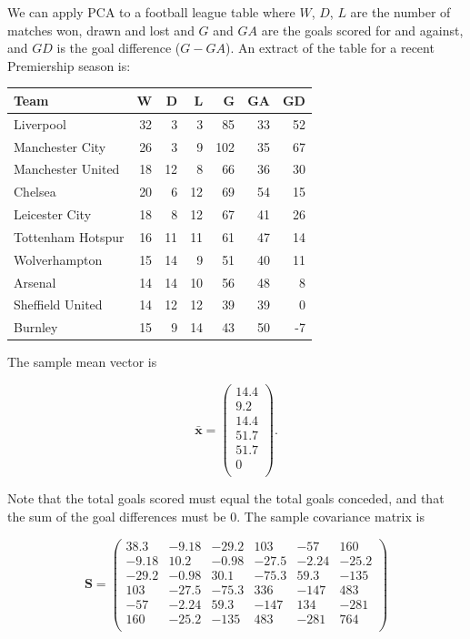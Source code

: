 \documentclass[]{book}
\theoremstyle{definition}
\theoremstyle{definition}
\theoremstyle{definition}
\theoremstyle{remark}
\begin{document}
We can apply PCA to a football league table where \(W\), \(D\), \(L\) are the number of matches won, drawn and lost and \(G\) and \(GA\) are the goals scored for and against, and \(GD\) is the goal difference (\(G-GA\)). An extract of the table for a recent Premiership season is:

\begin{tabular}{lrrrrrr}
\toprule
Team & W & D & L & G & GA & GD\\
\midrule
Liverpool & 32 & 3 & 3 & 85 & 33 & 52\\
Manchester City & 26 & 3 & 9 & 102 & 35 & 67\\
Manchester United & 18 & 12 & 8 & 66 & 36 & 30\\
Chelsea & 20 & 6 & 12 & 69 & 54 & 15\\
Leicester City & 18 & 8 & 12 & 67 & 41 & 26\\
\addlinespace
Tottenham Hotspur & 16 & 11 & 11 & 61 & 47 & 14\\
Wolverhampton & 15 & 14 & 9 & 51 & 40 & 11\\
Arsenal & 14 & 14 & 10 & 56 & 48 & 8\\
Sheffield United & 14 & 12 & 12 & 39 & 39 & 0\\
Burnley & 15 & 9 & 14 & 43 & 50 & -7\\
\bottomrule
\end{tabular}

The sample mean vector is

\[\bar{\boldsymbol x} =\begin{pmatrix}14.4 \\9.2 \\14.4 \\51.7 \\51.7 \\0 \\\end{pmatrix}.\]

Note that the total goals scored must equal the total goals conceded, and that the sum of the goal differences must be \(0\). The sample covariance matrix is

\begin{equation}
\boldsymbol S= \begin{pmatrix}38.3&-9.18&-29.2&103&-57&160 \\-9.18&10.2&-0.98&-27.5&-2.24&-25.2 \\-29.2&-0.98&30.1&-75.3&59.3&-135 \\103&-27.5&-75.3&336&-147&483 \\-57&-2.24&59.3&-147&134&-281 \\160&-25.2&-135&483&-281&764 \\\end{pmatrix}
\label{eq:PLES}
\end{equation}
\end{document}
